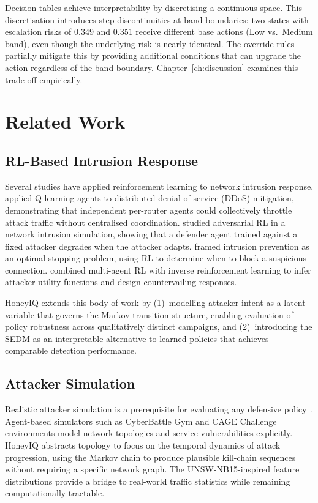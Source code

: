 Decision tables achieve interpretability by discretising a continuous space.
This discretisation introduces step discontinuities at band boundaries:
two states with escalation risks of 0.349 and 0.351 receive different base
actions (Low vs.\ Medium band), even though the underlying risk is nearly
identical.
The override rules partially mitigate this by providing additional conditions
that can upgrade the action regardless of the band boundary.
Chapter~\ref{ch:discussion} examines this trade-off empirically.

\section{Related Work}
\label{sec:bg_related}

\subsection{RL-Based Intrusion Response}

Several studies have applied reinforcement learning to network intrusion
response.
\citet{malialis2015distributed} applied Q-learning agents to distributed
denial-of-service (DDoS) mitigation, demonstrating that independent
per-router agents could collectively throttle attack traffic without
centralised coordination.
\citet{elderman2017adversarial} studied adversarial RL in a network
intrusion simulation, showing that a defender agent trained against a fixed
attacker degrades when the attacker adapts.
\citet{hammar2021learning} framed intrusion prevention as an optimal stopping
problem, using RL to determine when to block a suspicious connection.
\citet{li2019mad} combined multi-agent RL with inverse reinforcement learning
to infer attacker utility functions and design countervailing responses.

HoneyIQ extends this body of work by (1)~modelling attacker intent as a
latent variable that governs the Markov transition structure, enabling
evaluation of policy robustness across qualitatively distinct campaigns, and
(2)~introducing the SEDM as an interpretable alternative to learned policies
that achieves comparable detection performance.

\subsection{Attacker Simulation}

Realistic attacker simulation is a prerequisite for evaluating any defensive
policy~\citep{applebaum2017cyber}.
Agent-based simulators such as CyberBattle Gym and CAGE Challenge environments
model network topologies and service vulnerabilities explicitly.
HoneyIQ abstracts topology to focus on the temporal dynamics of attack
progression, using the Markov chain to produce plausible kill-chain sequences
without requiring a specific network graph.
The UNSW-NB15-inspired feature distributions provide a bridge to real-world
traffic statistics while remaining computationally tractable.

